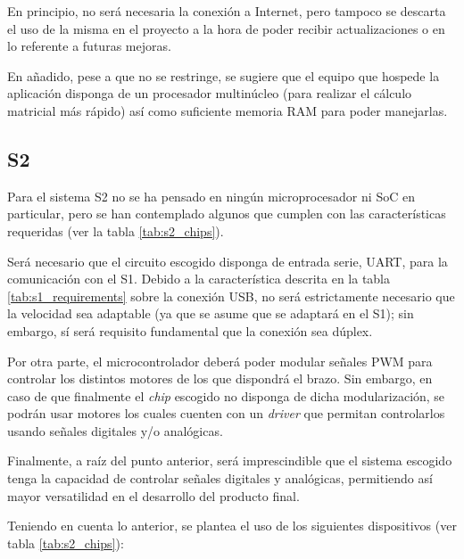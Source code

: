 En principio, no será necesaria la conexión a Internet, pero tampoco se descarta el uso de la misma en el proyecto a la hora de poder recibir actualizaciones o en lo referente a futuras mejoras.

En añadido, pese a que no se restringe, se sugiere que el equipo que hospede la aplicación disponga de un procesador multinúcleo (para realizar el cálculo matricial más rápido) así como suficiente memoria \ac{RAM} para poder manejarlas.

\subsection*{\ac{S2}}
Para el sistema \ac{S2} no se ha pensado en ningún microprocesador ni \ac{SoC} en particular, pero se han contemplado algunos que cumplen con las características requeridas (ver la tabla \ref{tab:s2_chips}).

Será necesario que el circuito escogido disponga de entrada serie, UART, para la comunicación con el \ac{S1}. Debido a la característica descrita en la tabla \ref{tab:s1_requirements} sobre la conexión \ac{USB}, no será estrictamente necesario que la velocidad sea adaptable (ya que se asume que se adaptará en el \ac{S1}); sin embargo, sí será requisito fundamental que la conexión sea dúplex.

Por otra parte, el microcontrolador deberá poder modular señales \ac{PWM} para controlar los distintos motores de los que dispondrá el brazo. Sin embargo, en caso de que finalmente el \textit{chip} escogido no disponga de dicha modularización, se podrán usar motores los cuales cuenten con un \textit{driver} que permitan controlarlos usando señales digitales y/o analógicas.

Finalmente, a raíz del punto anterior, será imprescindible que el sistema escogido tenga la capacidad de controlar señales digitales y analógicas, permitiendo así mayor versatilidad en el desarrollo del producto final.

Teniendo en cuenta lo anterior, se plantea el uso de los siguientes dispositivos (ver tabla \ref{tab:s2_chips}):

